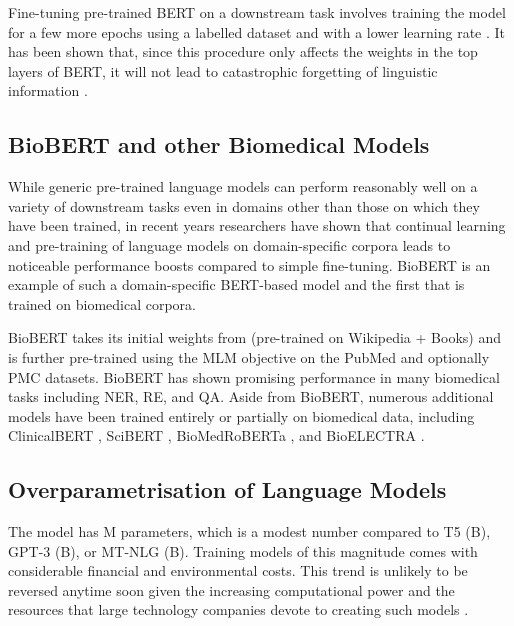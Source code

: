 \documentclass{article}
\begin{document}
Fine-tuning pre-trained BERT on a downstream task involves training the model for a few more epochs using a labelled dataset and with a lower learning rate  \citep{sun2019fine}. It has been shown that, since this procedure only affects the weights in the top layers of BERT, it will not lead to catastrophic forgetting of linguistic information \citep{merchant2020happens}. 

\subsection{BioBERT and other Biomedical Models}

While generic pre-trained language models can perform reasonably well on a variety of downstream tasks even in domains other than those on which they have been trained, in recent years researchers have shown that continual learning and pre-training of language models on domain-specific corpora leads to noticeable performance boosts compared to simple fine-tuning. BioBERT is an example of such a domain-specific BERT-based model and the first that is trained on biomedical corpora. 

BioBERT takes its initial weights from  (pre-trained on Wikipedia + Books) and is further pre-trained using the MLM objective on the PubMed and optionally PMC datasets. BioBERT has shown promising performance in many biomedical tasks including NER, RE, and QA. Aside from BioBERT, numerous additional models have been trained entirely or partially on biomedical data, including ClinicalBERT \citep{huang2019clinicalbert}, SciBERT \citep{beltagy-etal-2019-scibert}, BioMedRoBERTa \citep{gururangan-etal-2020-dont}, and BioELECTRA \citep{raj2021bioelectra}. 

\subsection{Overparametrisation of Language Models}

The  model has M parameters, which is a modest number compared to T5 (B), GPT-3 (B), or MT-NLG (B). Training models of this magnitude comes with considerable financial and environmental costs. This trend is unlikely to be reversed anytime soon given the increasing computational power and the resources that large technology companies devote to creating such models \citep{bender2021dangers}. 
\end{document}
